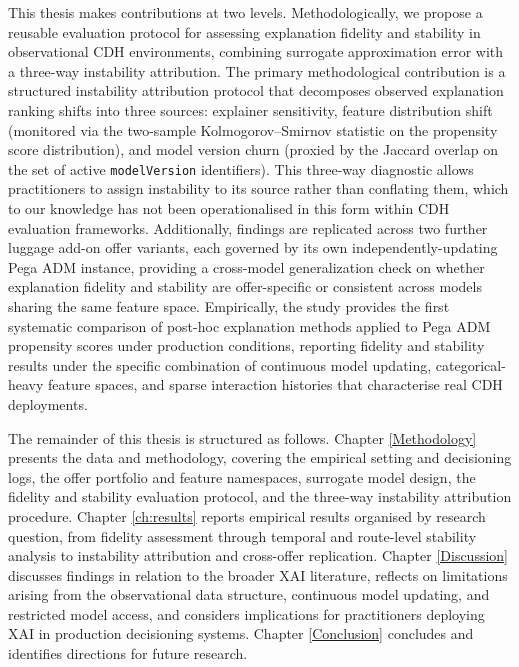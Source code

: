 \documentclass[oneside]{memoir} %
\begin{document}
\vspace{1em}


This thesis makes contributions at two levels. Methodologically, we propose a reusable evaluation protocol for assessing explanation fidelity and stability in observational CDH environments, combining surrogate approximation error with a three-way instability attribution. The primary methodological contribution is a structured instability attribution protocol that decomposes observed explanation ranking shifts into three sources: explainer sensitivity, feature distribution shift (monitored via the two-sample Kolmogorov--Smirnov statistic on the propensity score distribution), and model version churn (proxied by the Jaccard overlap on the set of active \texttt{modelVersion} identifiers). This three-way diagnostic allows practitioners to assign instability to its source rather than conflating them, which to our knowledge has not been operationalised in this form within CDH evaluation frameworks. Additionally, findings are replicated across two further luggage add-on offer variants, each governed by its own independently-updating Pega ADM instance, providing a cross-model generalization check on whether explanation fidelity and stability are offer-specific or consistent across models sharing the same feature space. Empirically, the study provides the first systematic comparison of post-hoc explanation methods applied to Pega ADM propensity scores under production conditions, reporting fidelity and stability results under the specific combination of continuous model updating, categorical-heavy feature spaces, and sparse interaction histories that characterise real CDH deployments.

The remainder of this thesis is structured as follows. Chapter \ref{Methodology} presents the data and methodology, covering the empirical setting and decisioning logs, the offer portfolio and feature namespaces, surrogate model design, the fidelity and stability evaluation protocol, and the three-way instability attribution procedure. Chapter \ref{ch:results} reports empirical results organised by research question, from fidelity assessment through temporal and route-level stability analysis to instability attribution and cross-offer replication. Chapter \ref{Discussion} discusses findings in relation to the broader XAI literature, reflects on limitations arising from the observational data structure, continuous model updating, and restricted model access, and considers implications for practitioners deploying XAI in production decisioning systems. Chapter \ref{Conclusion} concludes and identifies directions for future research.
\end{document}
